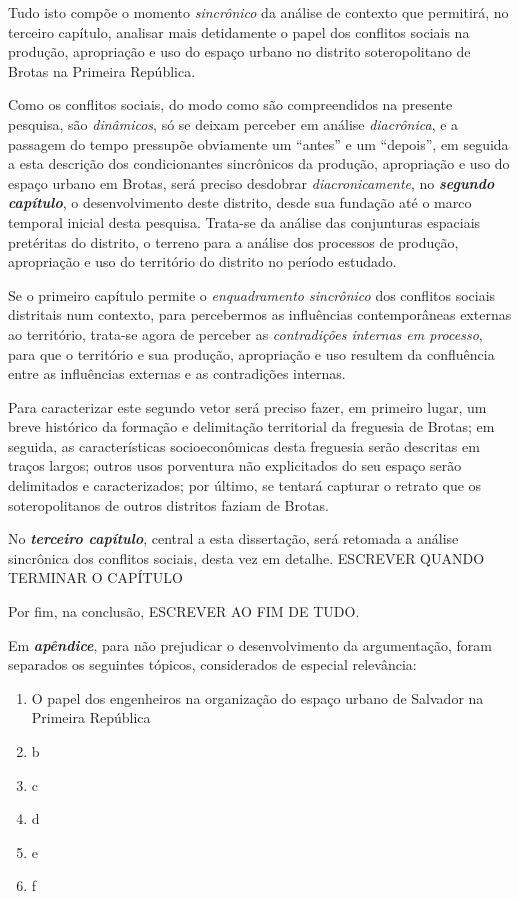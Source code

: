 Tudo isto compõe o momento \textit{sincrônico} da análise de contexto que permitirá, no terceiro capítulo, analisar mais detidamente o papel dos conflitos sociais na produção, apropriação e uso do espaço urbano no distrito soteropolitano de Brotas na Primeira República.

Como os conflitos sociais, do modo como são compreendidos na presente pesquisa, são \textit{dinâmicos}, só se deixam perceber em análise \textit{diacrônica}, e a passagem do tempo pressupõe obviamente um ``antes'' e um ``depois'', em seguida a esta descrição dos condicionantes sincrônicos da produção, apropriação e uso do espaço urbano em Brotas, será preciso desdobrar \textit{diacronicamente}, no \textbf{\textit{segundo capítulo}}, o desenvolvimento deste distrito, desde sua fundação até o marco temporal inicial desta pesquisa. Trata-se da análise das conjunturas espaciais pretéritas do distrito, o terreno para a análise dos processos de produção, apropriação e uso do território do distrito no período estudado. 

Se o primeiro capítulo permite o \textit{enquadramento sincrônico} dos conflitos sociais distritais num contexto, para percebermos as influências contemporâneas externas ao território, trata-se agora de perceber as \textit{contradições internas em processo}, para que o território e sua produção, apropriação e uso resultem da confluência entre as influências externas e as contradições internas. 

Para caracterizar este segundo vetor será preciso fazer, em primeiro lugar, um breve histórico da formação e delimitação territorial da freguesia de Brotas; em seguida, as características socioeconômicas desta freguesia serão descritas em traços largos; outros usos porventura não explicitados do seu espaço serão delimitados e caracterizados; por último, se tentará capturar o retrato que os soteropolitanos de outros distritos faziam de Brotas. 

No \textbf{\textit{terceiro capítulo}}, central a esta dissertação, será retomada a análise sincrônica dos conflitos sociais, desta vez em detalhe. ESCREVER QUANDO TERMINAR O CAPÍTULO

Por fim, na conclusão, ESCREVER AO FIM DE TUDO.

Em \textbf{\textit{apêndice}}, para não prejudicar o desenvolvimento da argumentação, foram separados os seguintes tópicos, considerados de especial relevância:

\begin{enumerate}
\item O papel dos engenheiros na organização do espaço urbano de Salvador na Primeira República
\item b
\item c
\item d
\item e
\item f
\end{enumerate}

